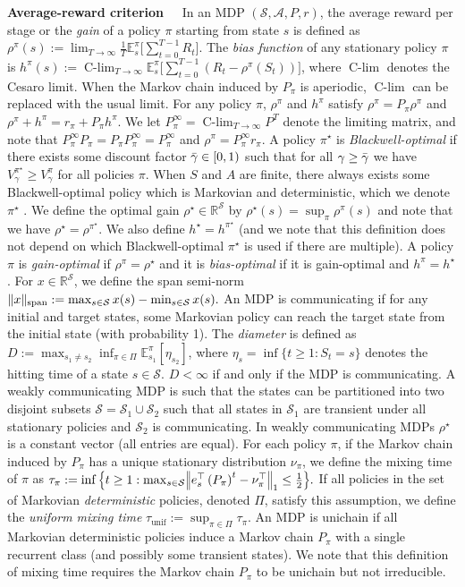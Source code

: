 \documentclass{article}
\theoremstyle{plain}
\theoremstyle{plain}
\theoremstyle{remark}
\theoremstyle{plain}
\theoremstyle{plain}
\newcommand{\R}{\mathbb{R}}
\newcommand{\E}{\mathbb{E}}
\newcommand{\pistar}{\pi^\star}
\newcommand{\A}{\mathcal{A}}
\renewcommand{\S}{\mathcal{S}}
\newcommand{\tmix}{\tau_{\mathrm{unif}}}
\DeclareMathOperator*{\Clim}{\text{C-lim}}
\newcommand\cig[1]{\scalerel*[5.5pt]{\Big#1}{%
  \ensurestackMath{\addstackgap[1.5pt]{\big#1}}}}
\newcommand\cigl[1]{\mathopen{\cig{#1}}}
\newcommand\cigr[1]{\mathclose{\cig{#1}}}
\begin{document}
\textbf{Average-reward criterion~~}
In an MDP $(\S, \A, P, r)$, the average reward per stage or the \emph{gain} of a policy $\pi$ starting from state $s$ is defined as $\rho^\pi(s)  := \lim_{T \to \infty} \frac{1}{T} \E_s^\pi \big[\sum_{t=0}^{T-1} R_t \big].$
The \emph{bias function} of any stationary policy $\pi$ is
$h^\pi(s) := \Clim_{T \to \infty} \E_s^\pi \big[\sum_{t=0}^{T-1} \left(R_t - \rho^\pi(S_t)\right) \big]$,
where $\Clim$ denotes the Cesaro limit. When the Markov chain induced by $P_\pi$ is aperiodic, $\Clim$ can be replaced with the usual limit. For any policy $\pi$, $\rho^\pi$ and $h^\pi$ satisfy $\rho^\pi = P_\pi \rho^\pi$ and $\rho^\pi + h^\pi = r_\pi + P_\pi h^\pi$. We let $P_\pi^\infty = \Clim_{T \to \infty} P^T$ denote the limiting matrix, and note that $P_\pi^\infty P_\pi = P_\pi P_\pi^\infty = P_\pi^\infty$ and $\rho^\pi = P_\pi^\infty r_\pi$.
A policy $\pistar$ is \emph{Blackwell-optimal} if there exists some discount factor $\Bar{\gamma} \in [0,1)$ such that for all $\gamma \geq \Bar{\gamma}$ we have $V^{\pistar}_\gamma \geq V^{\pi}_\gamma$ for all policies $\pi$. When $S$ and $A$ are finite, there always exists some Blackwell-optimal policy which is Markovian and deterministic, which we denote $\pistar$ \citep{puterman_markov_1994}. We define the optimal gain $\rho^\star\in \R^\S$ by $\rho^\star(s) = \sup_{\pi} \rho^\pi(s)$ and note that we have $\rho^\star = \rho^{\pistar}$. We also define $h^\star = h^{\pistar}$ (and we note that this definition does not depend on which Blackwell-optimal $\pistar$ is used if there are multiple). A policy $\pi$ is \textit{gain-optimal} if $\rho^\pi = \rho^\star$ and it is \textit{bias-optimal} if it is gain-optimal and $h^\pi = h^\star$. For $x \in \R^{\S} $, we define the span semi-norm  $\spannorm{x} := \max_{s \in \S} x(s) - \min_{s \in \S} x(s).$
%
An MDP is communicating if for any initial and target states, some Markovian policy can reach the target state from the initial state (with probability 1). The \emph{diameter} is defined as
$D := \max_{s_1 \neq s_2} \inf_{\pi\in \Pi} \E^\pi_{s_1} \left[\eta_{s_2}\right]$, where $\eta_{s} = \inf \{ t \geq 1 : S_t = s \}$ denotes the hitting time of a state $s\in\S$. $D < \infty$ if and only if the MDP is communicating.
A weakly communicating MDP is such that the states can be partitioned into two disjoint subsets $\S = \S_1 \cup \S_2$ such that all states in $\S_1$ are transient under all stationary policies and $\S_2$ is communicating. In weakly communicating MDPs $\rho^\star$ is a constant vector (all entries are equal). 
For each policy $\pi$, if the Markov chain induced by $P_\pi$ has a unique stationary distribution $\nu_\pi$, we define the mixing time of $\pi$ as
$\tau_\pi := \inf \cig\{t \geq 1 : \max_{s \in \S} \cigl\|e_s^\top \left(P_\pi \right)^t - \nu^\top_\pi \cigr\|_1 \leq \frac{1}{2} \cig\}.$
If all policies in the set of Markovian \textit{deterministic} policies, denoted $\Pi$, satisfy this assumption, we define the \emph{uniform mixing time} $\tmix := \sup_{\pi\in\Pi} \tau_\pi$. An MDP is unichain if all Markovian deterministic policies induce a Markov chain $P_\pi$ with a single recurrent class (and possibly some transient states).
We note that this definition of mixing time requires the Markov chain $P_\pi$ to be unichain but not irreducible.
\end{document}
